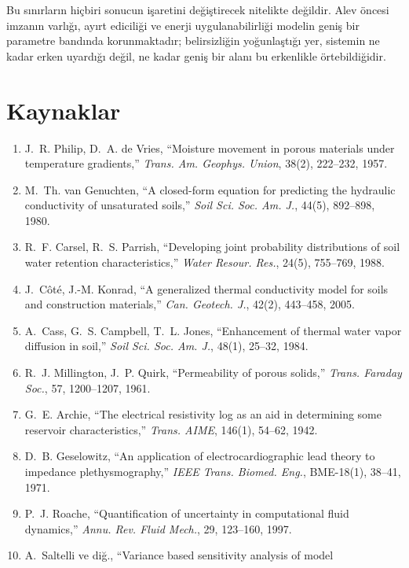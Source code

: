 \documentclass[11pt,a4paper]{article}
\begin{document}
Bu sınırların hiçbiri sonucun işaretini değiştirecek nitelikte değildir. Alev
öncesi imzanın varlığı, ayırt ediciliği ve enerji uygulanabilirliği modelin
geniş bir parametre bandında korunmaktadır; belirsizliğin yoğunlaştığı yer,
sistemin ne kadar erken uyardığı değil, ne kadar geniş bir alanı bu erkenlikle
örtebildiğidir.

\section*{Kaynaklar}
\small
\begin{enumerate}\setlength{\itemsep}{0pt}
\item J.~R. Philip, D.~A. de Vries, ``Moisture movement in porous materials
under temperature gradients,'' \emph{Trans. Am. Geophys. Union}, 38(2),
222--232, 1957.
\item M.~Th. van Genuchten, ``A closed-form equation for predicting the
hydraulic conductivity of unsaturated soils,'' \emph{Soil Sci. Soc. Am. J.},
44(5), 892--898, 1980.
\item R.~F. Carsel, R.~S. Parrish, ``Developing joint probability
distributions of soil water retention characteristics,'' \emph{Water Resour.
Res.}, 24(5), 755--769, 1988.
\item J.~Côté, J.-M. Konrad, ``A generalized thermal conductivity model for
soils and construction materials,'' \emph{Can. Geotech. J.}, 42(2), 443--458,
2005.
\item A.~Cass, G.~S. Campbell, T.~L. Jones, ``Enhancement of thermal water
vapor diffusion in soil,'' \emph{Soil Sci. Soc. Am. J.}, 48(1), 25--32, 1984.
\item R.~J. Millington, J.~P. Quirk, ``Permeability of porous solids,''
\emph{Trans. Faraday Soc.}, 57, 1200--1207, 1961.
\item G.~E. Archie, ``The electrical resistivity log as an aid in determining
some reservoir characteristics,'' \emph{Trans. AIME}, 146(1), 54--62, 1942.
\item D.~B. Geselowitz, ``An application of electrocardiographic lead theory
to impedance plethysmography,'' \emph{IEEE Trans. Biomed. Eng.}, BME-18(1),
38--41, 1971.
\item P.~J. Roache, ``Quantification of uncertainty in computational fluid
dynamics,'' \emph{Annu. Rev. Fluid Mech.}, 29, 123--160, 1997.
\item A.~Saltelli ve diğ., ``Variance based sensitivity analysis of model

\end{enumerate}
\end{document}
